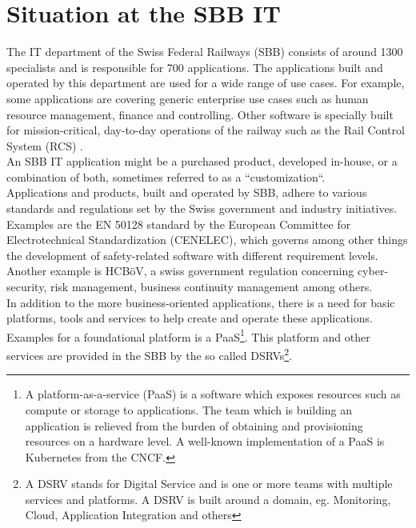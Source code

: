 \documentclass[a4paper,10pt]{article}
\begin{document}
    \section{Situation at the SBB IT}
    \label{sec:sbbit}
    The IT department of the Swiss Federal Railways (SBB) consists of around 1300 specialists and is responsible for
    700 applications\parencite{sbbitkennzahlen}.
    The applications built and operated by this department are used for a wide range of use cases.
    For example, some applications are covering generic enterprise use cases such as human resource management, finance
    and controlling.
    Other software is specially built for mission-critical, day-to-day operations of the railway such as the Rail Control
    System (RCS)\parencite{sbbrcs} .\\
    An SBB IT application might be a purchased product, developed in-house, or a combination of both, sometimes referred
    to as a ``customization``.\\
    Applications and products, built and operated by SBB, adhere to various standards and regulations set by the Swiss
    government and industry initiatives.
    Examples are the EN 50128 standard by the European Committee for Electrotechnical Standardization (CENELEC)\parencite{cenelec},
    which governs among other things the development of safety-related software with different requirement levels.
    Another example is HCBöV\parencite{hcboev}, a swiss government regulation concerning cyber-security, risk management,
    business continuity management among others.\\
    In addition to the more business-oriented applications, there is a need for basic platforms, tools and services to help create
    and operate these applications.
    Examples for a foundational platform is a PaaS\footnote{A platform-as-a-service (PaaS) is a software which exposes
    resources such as compute or storage to applications. The team which is building an application is relieved from the
    burden of obtaining and provisioning resources on a hardware level. A well-known implementation of a PaaS is Kubernetes from the CNCF.}.
    This platform and other services are provided in the SBB by the so called DSRVs\footnote{
        A DSRV stands for Digital Service and is one or more teams with multiple services and platforms. A DSRV is built
        around a domain, eg. Monitoring, Cloud, Application Integration and others}.
\end{document}

